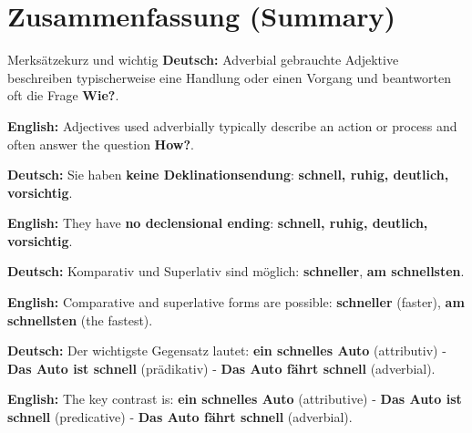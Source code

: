 \documentclass[a4paper,11pt]{article}
\newcommand{\GermanText}[1]{\textbf{Deutsch: }#1\par}
\newcommand{\EnglishText}[1]{{\small\color{SoftGray}\textbf{English: }#1\par}}
\begin{document}
    \section{Zusammenfassung \textnormal{(Summary)}}

        \begin{grammarentry}{Merksätze}{kurz und wichtig}
            \GermanText{Adverbial gebrauchte Adjektive beschreiben typischerweise eine Handlung oder einen Vorgang und beantworten oft die Frage \textbf{Wie?}.}
            \EnglishText{Adjectives used adverbially typically describe an action or process and often answer the question \textbf{How?}.}

            \GermanText{Sie haben \textbf{keine Deklinationsendung}: \textbf{schnell, ruhig, deutlich, vorsichtig}.}
            \EnglishText{They have \textbf{no declensional ending}: \textbf{schnell, ruhig, deutlich, vorsichtig}.}

            \GermanText{Komparativ und Superlativ sind möglich: \textbf{schneller}, \textbf{am schnellsten}.}
            \EnglishText{Comparative and superlative forms are possible: \textbf{schneller} (faster), \textbf{am schnellsten} (the fastest).}

            \GermanText{Der wichtigste Gegensatz lautet: \textbf{ein schnelles Auto} (attributiv) - \textbf{Das Auto ist schnell} (prädikativ) - \textbf{Das Auto fährt schnell} (adverbial).}
            \EnglishText{The key contrast is: \textbf{ein schnelles Auto} (attributive) - \textbf{Das Auto ist schnell} (predicative) - \textbf{Das Auto fährt schnell} (adverbial).}
        \end{grammarentry}
\end{document}

